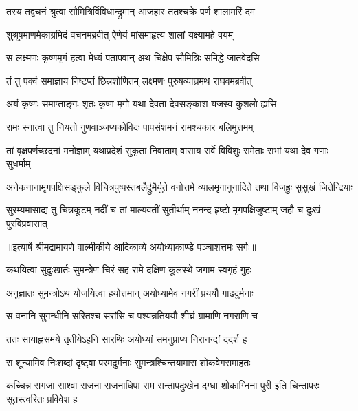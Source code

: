 \twolineshloka
{तस्य तद्वचनं श्रुत्वा सौमित्रिर्विविधान्द्रुमान्}
{आजहार ततश्चक्रे पर्ण शालामरिं दम} %

\twolineshloka
{शुश्रूषमाणमेकाग्रमिदं वचनमब्रवीत्}
{ऐणेयं मांसमाहृत्य शालां यक्ष्यामहे वयम्} %

\twolineshloka
{स लक्ष्मणः कृष्णमृगं हत्वा मेध्यं पतापवान्}
{अथ चिक्षेप सौमित्रिः समिद्धे जातवेदसि} %

\twolineshloka
{तं तु पक्वं समाज्ञाय निष्टप्तं छिन्नशोणितम्}
{लक्ष्मणः पुरुषव्याघ्रमथ राघवमब्रवीत्} %

\twolineshloka
{अयं कृष्णः समाप्ताङ्गः शृतः कृष्ण मृगो यथा}
{देवता देवसङ्काश यजस्व कुशलो ह्यसि} %

\twolineshloka
{रामः स्नात्वा तु नियतो गुणवाञ्जप्यकोविदः}
{पापसंशमनं रामश्चकार बलिमुत्तमम्} %

\fourlineindentedshloka
{तां वृक्षपर्णच्छदनां मनोज्ञाम्}
{यथाप्रदेशं सुकृतां निवाताम्}
{वासाय सर्वे विविशुः समेताः}
{सभां यथा देव गणाः सुधर्माम्} %

\fourlineindentedshloka
{अनेकनानामृगपक्षिसङ्कुले}
{विचित्रपुष्पस्तबलैर्द्रुमैर्युते}
{वनोत्तमे व्यालमृगानुनादिते}
{तथा विजह्रुः सुसुखं जितेन्द्रियाः} %

\fourlineindentedshloka
{सुरम्यमासाद्य तु चित्रकूटम्}
{नदीं च तां माल्यवतीं सुतीर्थाम्}
{ननन्द हृष्टो मृगपक्षिजुष्टाम्}
{जहौ च दुःखं पुरविप्रवासात्} %


{॥इत्यार्षे श्रीमद्रामायणे वाल्मीकीये आदिकाव्ये अयोध्याकाण्डे पञ्चाशत्तमः सर्गः॥}


\twolineshloka
{कथयित्वा सुदुःखार्तः सुमन्त्रेण चिरं सह}
{रामे दक्षिण कूलस्थे जगाम स्वगृहं गुहः} %

\twolineshloka
{अनुज्ञातः सुमन्त्रोऽथ योजयित्वा हयोत्तमान्}
{अयोध्यामेव नगरीं प्रययौ गाढदुर्मनाः} %

\twolineshloka
{स वनानि सुगन्धीनि सरितश्च सरांसि च}
{पश्यन्नतिययौ शीघ्रं ग्रामाणि नगराणि च} %

\twolineshloka
{ततः सायाह्नसमये तृतीयेऽहनि सारथिः}
{अयोध्यां समनुप्राप्य निरानन्दां ददर्श ह} %

\twolineshloka
{स शून्यामिव निःशब्दां दृष्ट्वा परमदुर्मनाः}
{सुमन्त्रश्चिन्तयामास शोकवेगसमाहतः} %

\threelineshloka
{कच्चिन्न सगजा साश्वा सजना सजनाधिपा}
{राम सन्तापदुःखेन दग्धा शोकाग्निना पुरी}
{इति चिन्तापरः सूतस्त्वरितः प्रविवेश ह} %

